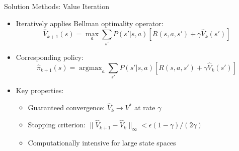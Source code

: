 \documentclass[10pt]{beamer}
\DeclareMathOperator*{\maxop}{max} %
\DeclareMathOperator*{\argmax}{argmax} %
\begin{document}
\begin{frame}{Solution Methods: Value Iteration}
    \begin{itemize}
        \item Iteratively applies Bellman optimality operator:
        \begin{equation}
            \hat{V}_{k+1}(s) = \maxop_a \sum_{s'} P(s'|s,a) \left[ R(s,a,s') + \gamma \hat{V}_k(s') \right]
        \end{equation}

        \item Corresponding policy:
        \begin{equation}
            \hat{\pi}_{k+1}(s) = \argmax_a \sum_{s'} P(s'|s,a) \left[ R(s,a,s') + \gamma \hat{V}_k(s') \right]
        \end{equation}

        \item Key properties:
        \begin{itemize}
            \item Guaranteed convergence: $\hat{V}_k \to V^*$ at rate $\gamma$
            \item Stopping criterion: $\|\hat{V}_{k+1} - \hat{V}_k\|_{\infty} < \epsilon(1-\gamma)/(2\gamma)$ %
            \item Computationally intensive for large state spaces
        \end{itemize}
    \end{itemize}
\end{frame}

\end{document}
